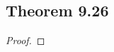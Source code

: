 \documentclass[../../main.tex]{subfiles}
\begin{document}
\subsection{Theorem 9.26}
\begin{wts}

\end{wts}
\begin{proof}

\end{proof}
\end{document}
